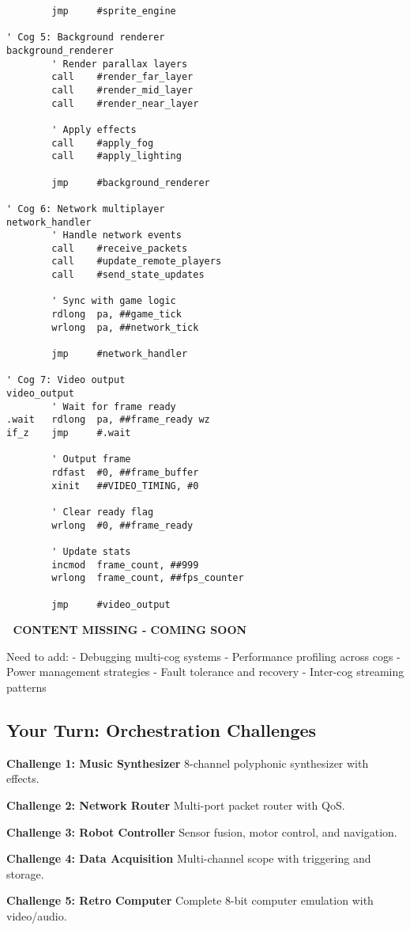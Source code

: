 \documentclass[11pt]{book}
\begin{document}
\begin{lstlisting}
        jmp     #sprite_engine

' Cog 5: Background renderer
background_renderer
        ' Render parallax layers
        call    #render_far_layer
        call    #render_mid_layer
        call    #render_near_layer
        
        ' Apply effects
        call    #apply_fog
        call    #apply_lighting
        
        jmp     #background_renderer

' Cog 6: Network multiplayer
network_handler
        ' Handle network events
        call    #receive_packets
        call    #update_remote_players
        call    #send_state_updates
        
        ' Sync with game logic
        rdlong  pa, ##game_tick
        wrlong  pa, ##network_tick
        
        jmp     #network_handler

' Cog 7: Video output
video_output
        ' Wait for frame ready
.wait   rdlong  pa, ##frame_ready wz
if_z    jmp     #.wait
        
        ' Output frame
        rdfast  #0, ##frame_buffer
        xinit   ##VIDEO_TIMING, #0
        
        ' Clear ready flag
        wrlong  #0, ##frame_ready
        
        ' Update stats
        incmod  frame_count, ##999
        wrlong  frame_count, ##fps_counter
        
        jmp     #video_output
\end{lstlisting}

\begin{missing}
🚧 \textbf{CONTENT MISSING - COMING SOON}

Need to add:
- Debugging multi-cog systems
- Performance profiling across cogs
- Power management strategies
- Fault tolerance and recovery
- Inter-cog streaming patterns
\end{missing}

\hypertarget{your-turn-orchestration-challenges}{%
\subsection{Your Turn: Orchestration
Challenges}\label{your-turn-orchestration-challenges}}

\begin{yourturn}
\textbf{Challenge 1: Music Synthesizer}
8-channel polyphonic synthesizer with effects.

\textbf{Challenge 2: Network Router}
Multi-port packet router with QoS.

\textbf{Challenge 3: Robot Controller}
Sensor fusion, motor control, and navigation.

\textbf{Challenge 4: Data Acquisition}
Multi-channel scope with triggering and storage.

\textbf{Challenge 5: Retro Computer}
Complete 8-bit computer emulation with video/audio.
\end{yourturn}
\end{document}
